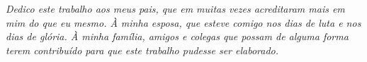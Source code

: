 \documentclass[
	12pt,				%
	openright,			%
	twoside,			%
	a4paper,			%
	english,			%
	spanish,			%
	brazil,				%
	]{abntex2}
\newcommand\blankpage{%
    \null
    \thispagestyle{empty}%
    \addtocounter{page}{-1}%
    \newpage}
\begin{document}
% 





    
    

      
  




\begin{dedicatoria}
    \vspace*{\fill}
    \centering
    \noindent
    \textit{ Dedico este trabalho aos meus pais, que em muitas vezes acreditaram mais em mim do que eu mesmo. À minha esposa, que esteve comigo nos dias de luta e nos dias de glória. À minha família, amigos e colegas que possam de alguma forma terem contribuído para que este trabalho pudesse ser elaborado.} \vspace*{\fill}
\end{dedicatoria}
\afterpage{\blankpage}
\end{document}
